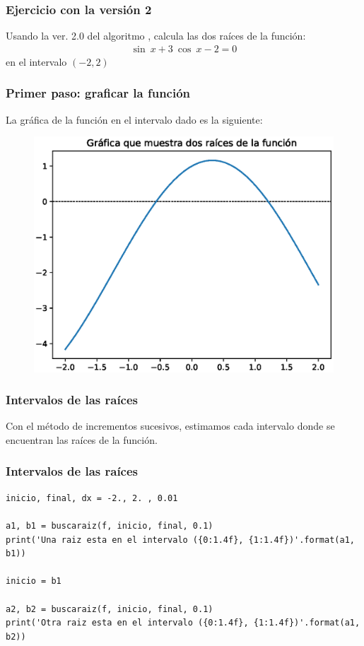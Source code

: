 \documentclass[12pt]{beamer}
\begin{document}
\begin{frame}
\frametitle{Ejercicio con la versión 2}
Usando la ver. 2.0 del algoritmo , calcula las dos raíces de la función:
\begin{align*}
\sin \: x + 3 \: \cos \: x - 2 = 0
\end{align*}
en el intervalo $(-2, 2)$
\end{frame}
\begin{frame}
\frametitle{Primer paso: graficar la función}
La gráfica de la función en el intervalo dado es la siguiente:
\begin{figure}
	\centering
	\includegraphics[scale=0.5]{Imagenes/Ejercicio_NR_Seno_01.eps}
\end{figure}
\end{frame}
\begin{frame}[fragile]
\frametitle{Intervalos de las raíces}
Con el método de incrementos sucesivos, estimamos cada intervalo donde se encuentran las raíces de la función.
\end{frame}
\begin{frame}
\frametitle{Intervalos de las raíces}
\begin{lstlisting}[caption=Intervalos para las raíces]
inicio, final, dx = -2., 2. , 0.01

a1, b1 = buscaraiz(f, inicio, final, 0.1)
print('Una raiz esta en el intervalo ({0:1.4f}, {1:1.4f})'.format(a1, b1))

inicio = b1

a2, b2 = buscaraiz(f, inicio, final, 0.1)
print('Otra raiz esta en el intervalo ({0:1.4f}, {1:1.4f})'.format(a1, b2))
\end{lstlisting}
\end{frame}
\end{document}
